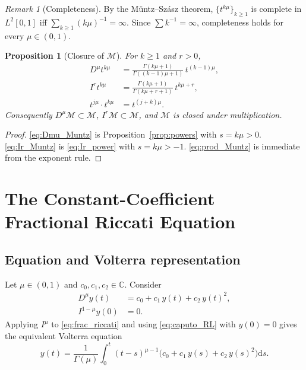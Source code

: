 \documentclass[12pt,a4paper]{amsart}
\newcommand{\dd}{\mathrm{d}}
\theoremstyle{plain}
\newtheorem{proposition}[theorem]{Proposition}
\theoremstyle{definition}
\theoremstyle{remark}
\newtheorem{remark}[theorem]{Remark}
\begin{document}
\begin{remark}[Completeness]\label{rem:muntz_complete}
By the M\"untz--Sz\'asz theorem, $\{t^{k\mu}\}_{k\ge 1}$ is complete in
$L^2[0,1]$ iff $\sum_{k\ge 1}(k\mu)^{-1}=\infty$. Since $\sum k^{-1}=\infty$,
completeness holds for every $\mu\in(0,1)$.
\end{remark}

\begin{proposition}[Closure of $\mathcal{M}$]\label{prop:closure_M}
For $k\ge 1$ and $r>0$,
\begin{align}
  D^{\mu}t^{k\mu} &= \frac{\Gamma(k\mu+1)}{\Gamma((k-1)\mu+1)}\,t^{(k-1)\mu},
  \label{eq:Dmu_Muntz}\\
  I^r t^{k\mu} &= \frac{\Gamma(k\mu+1)}{\Gamma(k\mu+r+1)}\,t^{k\mu+r},
  \label{eq:Ir_Muntz}\\
  t^{j\mu}\cdot t^{k\mu} &= t^{(j+k)\mu}.
  \label{eq:prod_Muntz}
\end{align}
Consequently $D^{\mu}\mathcal{M}\subset\mathcal{M}$,
$I^r\mathcal{M}\subset\mathcal{M}$, and $\mathcal{M}$ is closed under
multiplication.
\end{proposition}

\begin{proof}
\eqref{eq:Dmu_Muntz} is Proposition~\ref{prop:powers} with $s=k\mu>0$.
\eqref{eq:Ir_Muntz} is \eqref{eq:Ir_power} with $s=k\mu>-1$.
\eqref{eq:prod_Muntz} is immediate from the exponent rule.
\end{proof}

\section{The Constant-Coefficient Fractional Riccati Equation}
\label{sec:riccati}

\subsection{Equation and Volterra representation}

Let $\mu\in(0,1)$ and $c_0,c_1,c_2\in\mathbb{C}$. Consider
\begin{align}
  D^{\mu}y(t) &= c_0 + c_1\,y(t) + c_2\,y(t)^2,
  \label{eq:frac_riccati}\\
  I^{1-\mu}y(0) &= 0. \label{eq:IC}
\end{align}
Applying $I^{\mu}$ to \eqref{eq:frac_riccati} and using \eqref{eq:caputo_RL}
with $y(0)=0$ gives the equivalent Volterra equation
\begin{equation}\label{eq:frac_riccati_V}
  y(t) = \frac{1}{\Gamma(\mu)}\int_0^t(t-s)^{\mu-1}
         \bigl(c_0+c_1\,y(s)+c_2\,y(s)^2\bigr)\dd s.
\end{equation}
\end{document}
